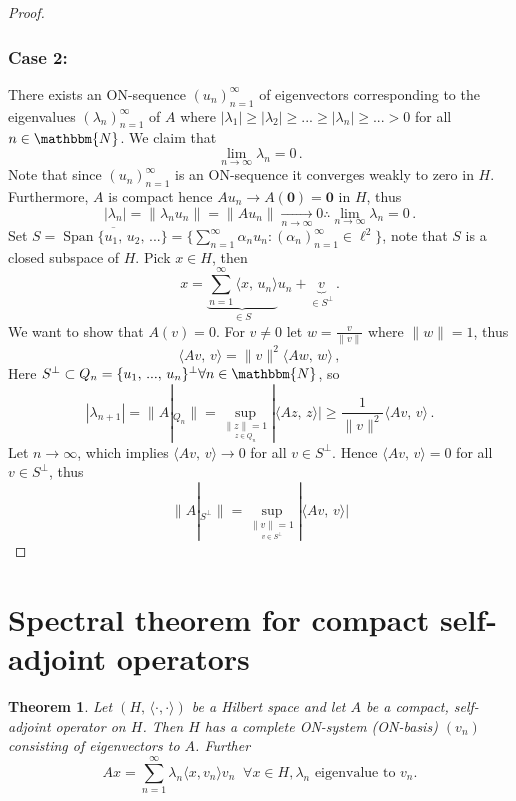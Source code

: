 \documentclass[12pt, a4paper]{article}
\newcommand{\N}{\ensuremath{\mathbbm{N}}}
\newtheorem{theorem}{Theorem}[section]
\begin{document}
\begin{proof}
\subsubsection*{Case 2:}
There exists an ON-sequence $(u_n)_{n=1}^\infty$ of eigenvectors corresponding to the eigenvalues $(\lambda_n)_{n=1}^\infty$ of $A$ where $|\lambda_1|\geq |\lambda_2|\geq ...\geq |\lambda_n|\geq ...>0$ for all $n\in\N$. We claim that
\[
    \lim_{n\to\infty}\lambda_n=0\,.
\]
Note that since $(u_n)_{n=1}^\infty$ is an ON-sequence it converges weakly to zero in $H$. Furthermore, $A$ is compact hence $Au_n\to A(\mathbf{0})=\mathbf{0}$ in $H$, thus
\[
    |\lambda_n|=\|\lambda_n u_n\|=\|Au_n\|\underset{n\to\infty}{\longrightarrow}0\therefore\lim_{n\to\infty}\lambda_n=0\,.
\]
Set $S=\overline{\operatorname{Span}\{u_1,\,u_2,\,...\}}=\{\sum_{n=1}^\infty\alpha_nu_n:(\alpha_n)_{n=1}^\infty\in\ell^2\}$, note that $S$ is a closed subspace of $H$. Pick $x\in H$, then
\[
    x=\underbrace{\sum_{n=1}^\infty\langle x,\,u_n\rangle}_{\in S} u_n+\underbrace{v}_{\in S^\perp}\,.
\]
We want to show that $A(v)=0$. For $v\neq 0$ let $w=\frac{v}{\|v\|}$ where $\|w\|=1$, thus
\[
    \langle Av,\,v\rangle=\|v\|^2\langle Aw,\,w\rangle\,,
\]
Here $S^\perp\subset Q_n=\{u_1,\,...,\,u_n\}^\perp\forall n \in\N$, so
\[
    |\lambda_{n+1}|=\|A|_{Q_n}\|=\underset{\underset{z\in Q_n}{\|z\|=1}}{\operatorname{sup}}|\langle Az,\,z\rangle |\geq \dfrac{1}{\|v\|^2}\langle Av,\,v\rangle\,.
\]
Let $n\to\infty$, which implies $\langle Av,\,v\rangle\to 0$ for all $v\in S^\perp$. Hence $\langle Av,\,v\rangle=0$ for all $v\in S^\perp$, thus
\[
    \|A|_{S^\perp}\|=\underset{\underset{v\in S^\perp}{\|v\|=1}}{\operatorname{sup}}|\langle Av,\,v\rangle |
\]
\end{proof}

\section{Spectral theorem for compact self-adjoint operators}
\begin{theorem}
Let $(H,\,\langle \cdot, \cdot \rangle)$ be a Hilbert space and let $A$ be a compact, self-adjoint operator on $H$. Then $H$ has a complete ON-system (ON-basis) $(v_n)$ consisting of eigenvectors to $A$. Further
\begin{equation}
\label{spectralth}
Ax = \sum_{n=1}^\infty \lambda_n \langle x, v_n \rangle v_n \;\; \forall x \in H, \lambda_n \text{ eigenvalue to } v_n.
\end{equation}
\end{theorem}
\end{document}
